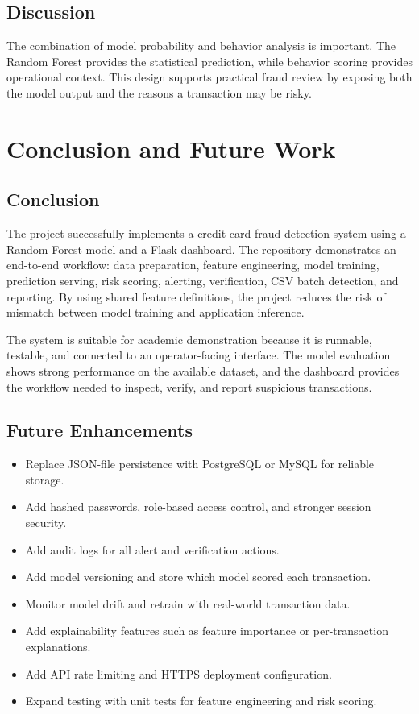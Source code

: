 \documentclass[12pt,a4paper]{report}
\begin{document}
\section{Discussion}
The combination of model probability and behavior analysis is important. The Random Forest provides the statistical prediction, while behavior scoring provides operational context. This design supports practical fraud review by exposing both the model output and the reasons a transaction may be risky.

\chapter{Conclusion and Future Work}

\section{Conclusion}
The project successfully implements a credit card fraud detection system using a Random Forest model and a Flask dashboard. The repository demonstrates an end-to-end workflow: data preparation, feature engineering, model training, prediction serving, risk scoring, alerting, verification, CSV batch detection, and reporting. By using shared feature definitions, the project reduces the risk of mismatch between model training and application inference.

The system is suitable for academic demonstration because it is runnable, testable, and connected to an operator-facing interface. The model evaluation shows strong performance on the available dataset, and the dashboard provides the workflow needed to inspect, verify, and report suspicious transactions.

\section{Future Enhancements}
\begin{itemize}
    \item Replace JSON-file persistence with PostgreSQL or MySQL for reliable storage.
    \item Add hashed passwords, role-based access control, and stronger session security.
    \item Add audit logs for all alert and verification actions.
    \item Add model versioning and store which model scored each transaction.
    \item Monitor model drift and retrain with real-world transaction data.
    \item Add explainability features such as feature importance or per-transaction explanations.
    \item Add API rate limiting and HTTPS deployment configuration.
    \item Expand testing with unit tests for feature engineering and risk scoring.
\end{itemize}
\end{document}
